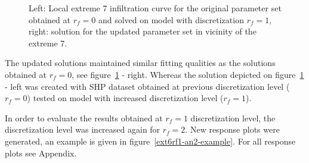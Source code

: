 \documentclass[review,times,3p,10pt]{elsarticle}
\begin{document}
\begin{figure}
\caption{Left: Local extreme 7 infiltration curve for the original parameter set obtained at $r_f=0$ and solved on model with discretization $r_f=1$, right: solution for the updated parameter set in  vicinity of the extreme 7.}
\label{rf1examples}
\end{figure}

The updated solutions maintained similar fitting qualities as the solutions obtained at $r_f=0$, see figure~\ref{rf1examples} - right. Whereas the solution depicted on figure~\ref{rf1examples} - left was created with SHP dataset obtained at previous discretization level ($r_f=0$) tested on model with increased discretization level ($r_f=1$).

In order to evaluate the results obtained at $r_f=1$ discretization level, the discretization level was increased again for $r_f=2$.  New response plots were generated, an example is given in figure~\ref{ext6rf1-an2-example}. For all response plots see Appendix.
\end{document}
